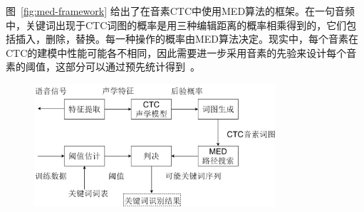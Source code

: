 图~\ref{fig:med-framework} 给出了在音素CTC中使用MED算法的框架。在一句音频中，关键词出现于CTC词图的概率是用三种编辑距离的概率相乘得到的，它们包括插入，删除，替换。每一种操作的概率由MED算法决定。现实中，每个音素在CTC的建模中性能可能各不相同，因此需要进一步采用音素的先验来设计每个音素的阈值，这部分可以通过预先统计得到~\cite{zhuang-is2016}。

\begin{figure}[!htp]
  \centering
    \captionstyle{\centering}
    \includegraphics[width=0.8\textwidth]{figure/kws-framework.png}
\end{figure}

